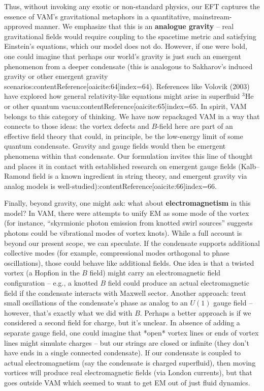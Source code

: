 \documentclass[12pt]{article}
\begin{document}
Thus, without invoking any exotic or non-standard physics, our EFT captures the essence of VAM’s gravitational metaphors in a quantitative, mainstream-approved manner. We emphasize that this is an \textbf{analogue gravity} – real gravitational fields would require coupling to the spacetime metric and satisfying Einstein’s equations, which our model does not do. However, if one were bold, one could imagine that perhaps our world’s gravity is just such an emergent phenomenon from a deeper condensate (this is analogous to Sakharov’s induced gravity or other emergent gravity scenarios:contentReference[oaicite:64]{index=64}). References like Volovik (2003) have explored how general relativity-like equations might arise in superfluid $^3$He or other quantum vacua:contentReference[oaicite:65]{index=65}. In spirit, VAM belongs to this category of thinking. We have now repackaged VAM in a way that connects to those ideas: the vortex defects and $B$-field here are part of an effective field theory that could, in principle, be the low-energy limit of some quantum condensate. Gravity and gauge fields would then be emergent phenomena within that condensate. Our formulation invites this line of thought and places it in contact with established research on emergent gauge fields (Kalb–Ramond field is a known ingredient in string theory, and emergent gravity via analog models is well-studied):contentReference[oaicite:66]{index=66}.

Finally, beyond gravity, one might ask: what about \textbf{electromagnetism} in this model? In VAM, there were attempts to unify EM as some mode of the vortex (for instance, “skyrmionic photon emission from knotted swirl sources” suggests photons could be vibrational modes of vortex knots). While a full account is beyond our present scope, we can speculate. If the condensate supports additional collective modes (for example, compressional modes orthogonal to phase oscillations), those could behave like additional fields. One idea is that a twisted vortex (a Hopfion in the $B$ field) might carry an electromagnetic field configuration – e.g., a knotted $B$ field could produce an actual electromagnetic field if the condensate interacts with Maxwell sector. Another approach: treat small oscillations of the condensate’s phase as analog to an $U(1)$ gauge field – however, that’s exactly what we did with $B$. Perhaps a better approach is if we considered a second field for charge, but it’s unclear. In absence of adding a separate gauge field, one could imagine that *open* vortex lines or ends of vortex lines might simulate charges – but our strings are closed or infinite (they don’t have ends in a single connected condensate). If our condensate is coupled to actual electromagnetism (say the condensate is charged superfluid), then moving vortices will produce real electromagnetic fields (via London currents), but that goes outside VAM which seemed to want to get EM out of just fluid dynamics.
\end{document}
